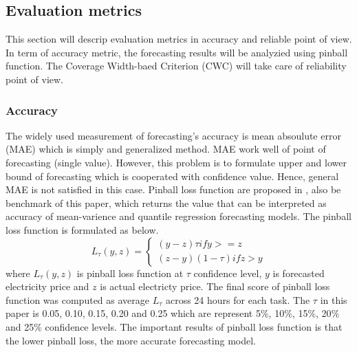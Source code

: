 \documentclass[review]{elsarticle}
\begin{document}
    \subsection{Evaluation metrics}
      This section will descrip evaluation metrics in accuracy and reliable point of view. In term of accuracy metric, the forecasting results will be analyzied using pinball function. The Coverage Width-baed Criterion (CWC) will take care of reliability point of view.

      \subsubsection{Accuracy}
        The widely used measurement of forecasting's accuracy is mean absoulute error (MAE) which is simply and generalized method. MAE work well of point of forecasting (single value). However, this problem is to formulate upper and lower bound of forecasting which is cooperated with confidence value. Hence, general MAE is not satisfied in this case.
        Pinball loss function are proposed in \cite{Maciejowska2016}, also be benchmark of this paper, which returns the value that can be interpreted as accuracy of mean-varience and quantile regression forecasting models. The pinball loss function is formulated as below.
        \begin{equation}
          L_{\tau}(y,z) =
          \begin{cases}
            (y-z)\tau if y>=z \\
            (z-y)(1-\tau) if z>y
          \end{cases}
          \label{eq.pinball}
        \end{equation}
        where $L_{\tau}(y,z)$ is pinball loss function at $\tau$ confidence level, $y$ is forecasted electricity price and $z$ is actual electricty price. The final score of pinball loss function was computed as average $L_{\tau}$ across 24 hours for each task. The $\tau$ in this paper is 0.05, 0.10, 0.15, 0.20 and 0.25 which are represent 5$\%$, 10$\%$, 15$\%$, 20$\%$ and 25$\%$ confidence levels.
        The important results of pinball loss function is that the lower pinball loss, the more accurate forecasting model.
\end{document}
